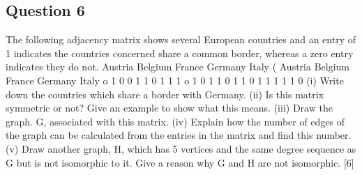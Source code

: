 \subsection{Question 6}
 The following adjacency matrix shows several European countries and an entry of 1 indicates the countries concerned share a common border, whereas a zero entry indicates they do not. 
Austria Belgium France Germany Italy 
( 
Austria Belgium France Germany Italy o 1 0 0 1 1 0 1 1 1 o 1 0 1 1 0 1 1 0 1 1 1 1 1 0 
(i) Write down the countries which share a border with Germany. (ii) Is this matrix symmetric or not? Give an example to show what this means. (iii) Draw the graph. G, associated with this matrix. (iv) Explain how the number of edges of the graph can be calculated from the entries in the matrix and find this number. (v) Draw another graph, H, which has 5 vertices and the same degree sequence as G but is not isomorphic to it. Give a reason why G and H are not isomorphic. [6] 




